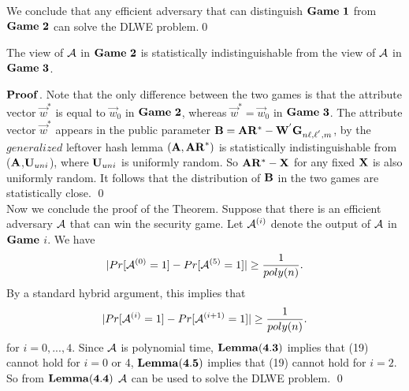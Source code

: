 We conclude that any efficient adversary that can distinguish $\mathbf{Game\ 1}$ from $\mathbf{Game\ 2}$ can solve the DLWE problem.\qed
\begin{lemma}
The view of $\mathcal{A}$ in $\mathbf{Game\ 2}$ is statistically indistinguishable from the view of $\mathcal{A}$ in $\mathbf{Game\ 3}$.
\end{lemma}
\noindent $\mathbf{Proof}$. Note that the only difference between the two games is that the attribute vector $\vec{w}^{*}$ is equal to $\vec{w}_{0}$ in $\mathbf{Game\ 2}$, whereas $\vec{w}^{*}=\vec{w}_{0}$ in $\mathbf{Game\ 3}$. The attribute vector $\vec{w}^{*}$ appears in the public parameter $\mathbf{B}=\mathbf{A}\mathbf{R}^{*}-\mathbf{W}^{'}\mathbf{G}_{n\ell,\ell^{'},m}$, by the $generalized$ leftover hash lemma $(\mathbf{A},\mathbf{AR}^{*})$ is statistically indistinguishable from ($\mathbf{A}$,$\mathbf{U}_{uni}$), where $\mathbf{U}_{uni}$ is uniformly random. So $\mathbf{A}\mathbf{R}^{*}-\mathbf{X}$ for any fixed $\mathbf{X}$ is also uniformly random. It follows that the distribution of $\mathbf{B}$ in the two games are statistically close. \qed \\[0.3cm]
Now we conclude the proof of the Theorem. Suppose that there is an efficient adversary $\mathcal{A}$ that can win the security game. Let $\mathcal{A}^{(i)}$ denote the output of $\mathcal{A}$ in $\mathbf{Game}$ $i$. We have
\begin{equation}
|Pr[\mathcal{A}^{(0)}=1]-Pr[\mathcal{A}^{(5)}=1]|\geq\frac{1}{poly(n)}.
\end{equation}
By a standard hybrid argument, this implies that
\begin{equation}
|Pr[\mathcal{A}^{(i)}=1]-Pr[\mathcal{A}^{(i+1)}=1]|\geq\frac{1}{poly(n)}.
\end{equation}
for $i=0,...,4$. Since $\mathcal{A}$ is polynomial time, $\mathbf{Lemma(4.3)}$ implies that (19) cannot hold for $i=0$ or 4, $\mathbf{Lemma(4.5)}$ implies that (19) cannot hold for $i=2$. So from $\mathbf{Lemma(4.4)}$ $\mathcal{A}$ can be used to solve the DLWE problem. \qed


